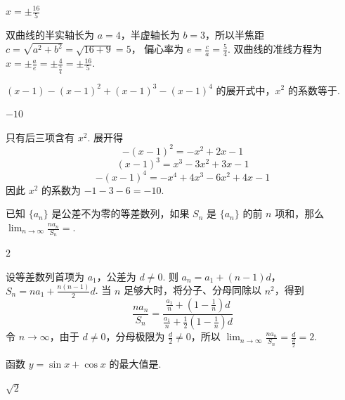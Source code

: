 \documentclass[UTF8,a4paper,oneside,11pt]{ctexbook}
\begin{document}
\begin{answer}
\(x=\pm\frac{16}{5}\)
\end{answer}

\begin{solution}
双曲线的半实轴长为 \(a=4\)，半虚轴长为 \(b=3\)，所以半焦距
\(c=\sqrt{a^2+b^2}=\sqrt{16+9}=5\)，
偏心率为 \(e=\frac ca=\frac54\). 双曲线的准线方程为
\(x=\pm\frac ae=\pm\frac{4}{\frac{5}{4}}=\pm\frac{16}{5}\).
\end{solution}

\begin{problem}
\((x - 1) - (x - 1)^{2} + (x - 1)^{3} - (x - 1)^{4}\) 的展开式中，\(x^{2}\) 的系数等于\fillinblank{}.
\end{problem}

\begin{answer}
\(-10\)
\end{answer}

\begin{solution}
只有后三项含有 \(x^2\). 展开得
\[
-(x-1)^2=-x^2+2x-1
\]
\[
(x-1)^3=x^3-3x^2+3x-1
\]
\[
-(x-1)^4=-x^4+4x^3-6x^2+4x-1
\]
因此 \(x^2\) 的系数为
\(-1-3-6=-10\).
\end{solution}

\begin{problem}
已知 \(\{a_n\}\) 是公差不为零的等差数列，如果 \(S_n\) 是 \(\{a_n\}\) 的前 \(n\) 项和，那么 \(\displaystyle\lim_{n\to\infty}\frac{na_n}{S_n}=\)\fillinblank{}.
\end{problem}

\begin{answer}
\(2\)
\end{answer}

\begin{solution}
	设等差数列首项为 \(a_1\)，公差为 \(d\ne0\). 则
\(a_n=a_1+(n-1)d\)，\(S_n=na_1+\frac{n(n-1)}{2}d\).
当 \(n\) 足够大时，将分子、分母同除以 \(n^2\)，得到
\[
\frac{na_n}{S_n}
=\frac{\frac{a_1}{n}+\left(1-\frac1n\right)d}
{\frac{a_1}{n}+\frac{1}{2}\left(1-\frac1n\right)d}
\]
令 \(n\to\infty\)，由于 \(d\ne0\)，分母极限为 \(\frac{d}{2}\ne0\)，所以
\(\displaystyle\lim_{n\to\infty}\frac{na_n}{S_n}=\frac d{\frac{d}{2}}=2\).
\end{solution}

\begin{problem}
函数 \(y=\sin x+\cos x\) 的最大值是\fillinblank{}.
\end{problem}

\begin{answer}
\(\sqrt{2}\)
\end{answer}
\end{document}
